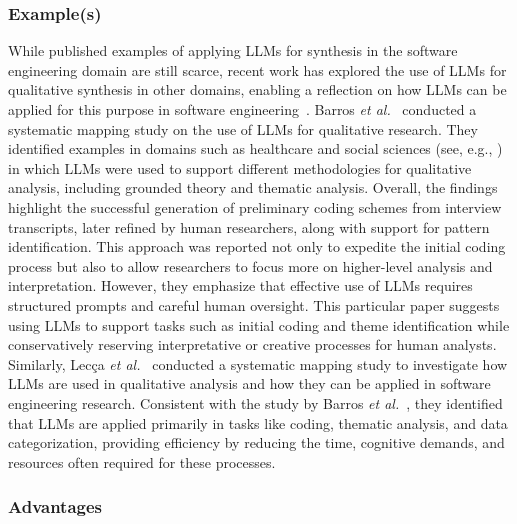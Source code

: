 \subsubsection{Example(s)} 

While published examples of applying LLMs for synthesis in the software engineering domain are still scarce, recent work has explored the use of LLMs for qualitative synthesis in other domains, enabling a reflection on how LLMs can be applied for this purpose in software engineering~\cite{DBLP:journals/ase/BanoHZT24}. Barros \textit{et al.}~\cite{barros2024largelanguagemodelqualitative} conducted a systematic mapping study on the use of LLMs for qualitative research. They identified examples in domains such as healthcare and social sciences (see, e.g., \cite{de2024performing,mathis2024inductive}) in which LLMs were used to support different methodologies for qualitative analysis, including grounded theory and thematic analysis. Overall, the findings highlight the successful generation of preliminary coding schemes from interview transcripts, later refined by human researchers, along with support for pattern identification. This approach was reported not only to expedite the initial coding process but also to allow researchers to focus more on higher-level analysis and interpretation. However, they emphasize that effective use of LLMs requires structured prompts and careful human oversight. This particular paper suggests using LLMs to support tasks such as initial coding and theme identification while conservatively reserving interpretative or creative processes for human analysts.
Similarly, Lecça \textit{et al.}~\cite{leça2024applicationsimplicationslargelanguage} conducted a systematic mapping study to investigate how LLMs are used in qualitative analysis and how they can be applied in software engineering research. Consistent with the study by Barros \textit{et al.}~\cite{barros2024largelanguagemodelqualitative}, they identified that LLMs are applied primarily in tasks like coding, thematic analysis, and data categorization, providing efficiency by reducing the time, cognitive demands, and resources often required for these processes.

\subsubsection{Advantages}

